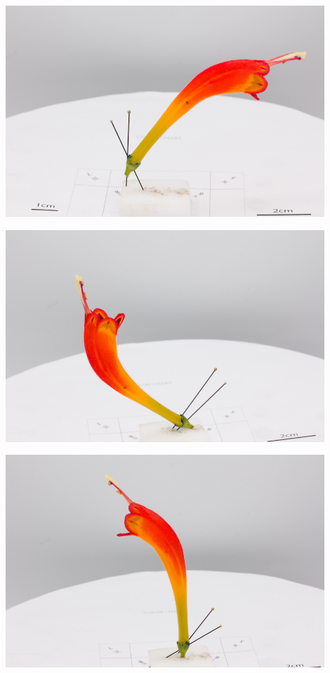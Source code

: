 \documentclass[
]{book}
\theoremstyle{definition}
\theoremstyle{definition}
\theoremstyle{definition}
\theoremstyle{definition}
\theoremstyle{remark}
\begin{document}
\includegraphics[width=0.9\textwidth,height=\textheight]{Figures/flowerplacement_1.png}

\includegraphics[width=0.9\textwidth,height=\textheight]{Figures/flowerplacement_2.jpg}

\includegraphics[width=0.9\textwidth,height=\textheight]{Figures/flowerplacement_3.jpg}
\end{document}
